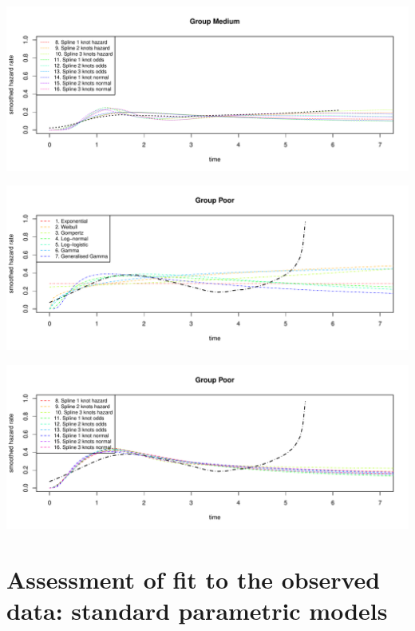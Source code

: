 \documentclass[
]{article}
\begin{document}
\begin{flushleft}\includegraphics[height=0.29\textheight]{Images/plot_haz_pred-4} \end{flushleft}

\begin{flushleft}\includegraphics[height=0.29\textheight]{Images/plot_haz_pred-5} \end{flushleft}

\begin{flushleft}\includegraphics[height=0.29\textheight]{Images/plot_haz_pred-6} \end{flushleft}

\newpage

\hypertarget{assessment-of-fit-to-the-observed-data-standard-parametric-models}{%
\section{Assessment of fit to the observed data: standard parametric
models}\label{assessment-of-fit-to-the-observed-data-standard-parametric-models}}
\end{document}
